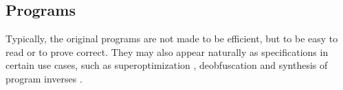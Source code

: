 \subsection{Programs}
\label{sec:programs}


Typically, the original programs are not made to be efficient, but to be easy to
read or to prove correct. They may also appear naturally as specifications in
certain use cases, such as
superoptimization \cite{Phothilimthana:2016:SUS},
deobfuscation \cite{Jha:oracle:2010} and
synthesis of program inverses \cite{Srivastava:2011:PIS}.
